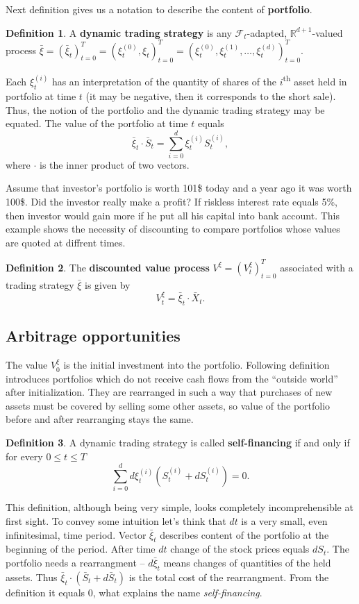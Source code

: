 \documentclass[a4paper,12pt, oneside]{book}
\theoremstyle{definition}
\newtheorem{mydef}{Definition}[section]
\theoremstyle{remark}
\def\R{{\mathbb{R}}}
\def\Sa{\bar{S}}
\def\Xa{\bar{X}}
\def\xia{\bar{\xi}}
\begin{document}
Next definition gives us a notation to describe the content of \textbf{portfolio}.
\begin{mydef}
A \textbf{dynamic trading strategy} is any $\mathcal{F}_t$-adapted,  $\R^{d+1}$-valued process $\xia = (\xia_t)_{t=0}^T = (\xi^{(0)}_t, \xi_t)_{t=0}^T = (\xi^{(0)}_t, \xi^{(1)}_t, \ldots, \xi^{(d)}_t)_{t=0}^T$.
\end{mydef}
Each $\xi^{(i)}_t$ has an interpretation of the quantity of shares of the $i$\textsuperscript{th} asset held in portfolio at time $t$ (it may be negative, then it corresponds to the short sale). Thus, the notion of the portfolio and the dynamic trading strategy may be equated. The value of the portfolio at time $t$ equals
\[\xia_t \cdot \Sa_t = \sum\limits_{i=0}^d \xi^{(i)}_t S^{(i)}_t,\]
where $\cdot$ is the inner product of two vectors.

Assume that investor's portfolio is worth 101\$ today and a year ago it was worth 100\$. Did the investor really make a profit? If riskless interest rate equals 5\%, then investor would gain more if he put all his capital into bank account. This example shows the necessity of discounting to compare portfolios whose values are quoted at diffrent times.
\begin{mydef}
 The \textbf{discounted value process} $V^{\xi} = (V^{\xi}_t)_{t=0}^T$ associated with a trading strategy $\xia$ is given by 
 \begin{equation*}
  V^{\xi}_t = \xia_t \cdot \Xa_t.
 \end{equation*}
\end{mydef}

\subsection{Arbitrage opportunities}
The value $V^{\xi}_0$ is the initial investment into the portfolio. Following definition introduces portfolios which do not receive cash flows from the ``outside world'' after initialization. They are rearranged in such a way that purchases of new assets must be covered by selling some other assets, so value of the portfolio before and after rearranging stays the same.
\begin{mydef}
 A dynamic trading strategy is called \textbf{self-financing} if and only if for every $0 \leq t \leq T$
 \[ \sum\limits_{i=0}^d d\xi^{(i)}_t (S^{(i)}_t + dS^{(i)}_t) = 0. \]
\end{mydef}
This definition, although being very simple, looks completely incomprehensible at first sight. To convey some intuition let's think that $dt$ is a very small, even infinitesimal, time period. Vector $\xia_t$ describes content of the portfolio at the beginning of the period. After time $dt$ change of the stock prices equals $dS_t$. The portfolio needs a rearrangment -- $d\xia_t$ means changes of quantities of the held assets. Thus $\xia_t \cdot (\Sa_t + d\Sa_t)$ is the total cost of the rearrangment. From the definition it equals 0, what explains the name \textit{self-financing}.
\end{document}
